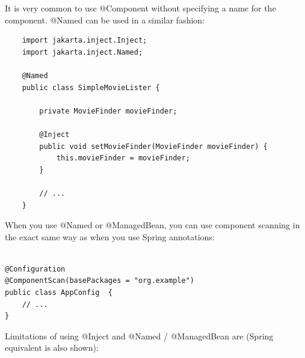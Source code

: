 \documentclass{scrartcl}
\begin{document}
It is very common to use @Component without specifying a name for the component. @Named can be used in a similar fashion:

\begin{lstlisting}
    import jakarta.inject.Inject;
    import jakarta.inject.Named;

    @Named
    public class SimpleMovieLister {

        private MovieFinder movieFinder;

        @Inject
        public void setMovieFinder(MovieFinder movieFinder) {
            this.movieFinder = movieFinder;
        }

        // ...
    }
\end{lstlisting}

When you use @Named or @ManagedBean, you can use component scanning in the exact same way as when you use Spring annotations:

\begin{lstlisting}

@Configuration
@ComponentScan(basePackages = "org.example")
public class AppConfig  {
    // ...
}

\end{lstlisting}

Limitations of using @Inject and @Named / @ManagedBean are (Spring equivalent is also shown):
\end{document}
